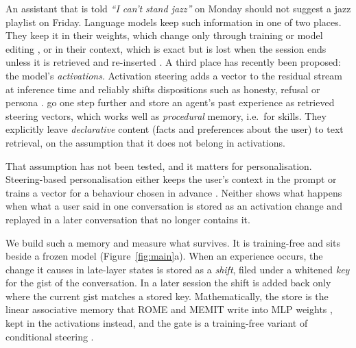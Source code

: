 \documentclass[11pt]{article}
\begin{document}
An assistant that is told \textit{``I can't stand jazz''} on Monday should not suggest a jazz playlist on Friday. Language models keep such information in one of two places. They keep it in their weights, which change only through training or model editing \citep{meng2022rome,meng2023memit}, or in their context, which is exact but is lost when the session ends unless it is retrieved and re-inserted \citep{lewis2020rag,packer2023memgpt}. A third place has recently been proposed: the model's \emph{activations}. Activation steering adds a vector to the residual stream at inference time and reliably shifts dispositions such as honesty, refusal or persona \citep{turner2023actadd,zou2023repe,rimsky2024caa,lee2025cast,cao2024bipo}. \citet{zhao2026npm} go one step further and store an agent's past experience as retrieved steering vectors, which works well as \emph{procedural} memory, i.e.\ for skills. They explicitly leave \emph{declarative} content (facts and preferences about the user) to text retrieval, on the assumption that it does not belong in activations.

That assumption has not been tested, and it matters for personalisation. Steering-based personalisation either keeps the user's context in the prompt \citep{he2025cos,liu2024icv} or trains a vector for a behaviour chosen in advance \citep{cao2024bipo}. Neither shows what happens when what a user said in one conversation is stored as an activation change and replayed in a later conversation that no longer contains it.

We build such a memory and measure what survives. It is training-free and sits beside a frozen model (Figure~\ref{fig:main}a). When an experience occurs, the change it causes in late-layer states is stored as a \emph{shift}, filed under a whitened \emph{key} for the gist of the conversation. In a later session the shift is added back only where the current gist matches a stored key. Mathematically, the store is the linear associative memory that ROME and MEMIT write into MLP weights \citep{meng2022rome,meng2023memit}, kept in the activations instead, and the gate is a training-free variant of conditional steering \citep{lee2025cast}.
\end{document}
